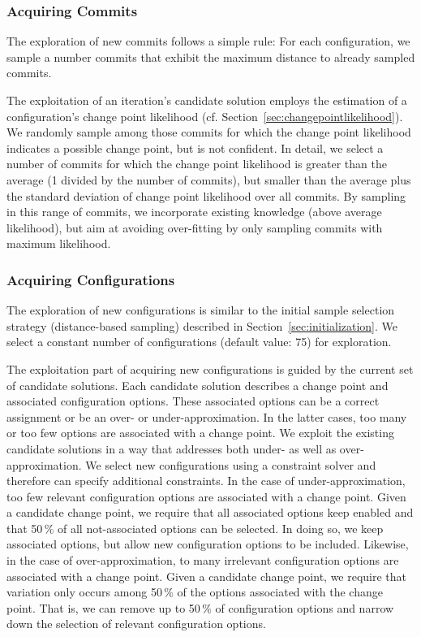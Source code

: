 \documentclass[sigconf]{acmart}
\begin{document}
	\subsubsection{Acquiring Commits}
	The exploration of new commits follows a simple rule: For each configuration, we sample a number commits that exhibit the maximum distance to already sampled commits. 
	
	The exploitation of an iteration's candidate solution employs the estimation of a configuration's change point likelihood (cf. Section~\ref{sec:changepointlikelihood}). We randomly sample among those commits for which the change point likelihood indicates a possible change point, but is not confident. In detail, we select a number of commits for which the change point likelihood is greater than the average (1 divided by the number of commits), but smaller than the average plus the standard deviation of change point likelihood over all commits. By sampling in this range of commits, we incorporate existing knowledge (above average likelihood), but aim at avoiding over-fitting by only sampling commits with maximum likelihood.
	
	\subsubsection{Acquiring Configurations}
	The exploration of new configurations is similar to the initial sample selection strategy (distance-based sampling) described in Section~\ref{sec:initialization}. We select a constant number of configurations (default value: 75) for exploration. 
	
	The exploitation part of acquiring new configurations is guided by the current set of candidate solutions. Each candidate solution describes a change point and associated configuration options. These associated options can be a correct assignment or be an over- or under-approximation. In the latter cases, too many or too few options are associated with a change point. We exploit the existing candidate solutions in a way that addresses both under- as well as over-approximation. We select new configurations using a constraint solver and therefore can specify additional constraints. 
	In the case of under-approximation, too few relevant configuration options are associated with a change point. Given a candidate change point, we require that all associated options keep enabled and that 50\,\% of all not-associated options can be selected. In doing so, we keep associated options, but allow new configuration options to be included. Likewise, in the case of over-approximation, to many irrelevant configuration options are associated with a change point. Given a candidate change point, we require that variation only occurs among 50\,\% of the options associated with the change point. That is, we can remove up to 50\,\% of configuration options and narrow down the selection of relevant configuration options.
	
\end{document}
